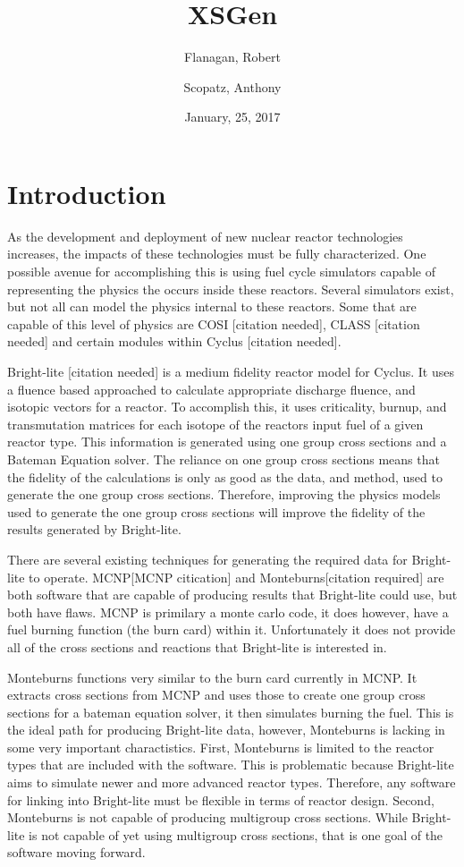 \documentclass{article}
\begin{document}
\title{XSGen}
\date{January, 25, 2017}
\author{Flanagan, Robert \and Scopatz, Anthony}
\maketitle

\section{Introduction}
As the development and deployment of new nuclear reactor technologies increases, the impacts of these technologies must be fully characterized. One possible avenue for accomplishing this is using fuel cycle simulators capable of representing the physics the occurs inside these reactors. Several simulators exist, but not all can model the physics internal to these reactors. Some that are capable of this level of physics are COSI [citation needed], CLASS [citation needed] and certain modules within Cyclus [citation needed]. 

Bright-lite [citation needed] is a medium fidelity reactor model for Cyclus. It uses a fluence based approached to calculate appropriate discharge fluence, and isotopic vectors for a reactor. To accomplish this, it uses criticality, burnup, and transmutation matrices for each isotope of the reactors input fuel of a given reactor type. This information is generated using one group cross sections and a Bateman Equation solver. The reliance on one group cross sections means that the fidelity of the calculations is only as good as the data, and method, used to generate the one group cross sections. Therefore, improving the physics models used to generate the one group cross sections will improve the fidelity of the results generated by Bright-lite. 

There are several existing techniques for generating the required data for Bright-lite to operate. MCNP[MCNP citication] and Monteburns[citation required] are both software that are capable of producing results that Bright-lite could use, but both have flaws. MCNP is primilary a monte carlo code, it does however, have a fuel burning function (the burn card) within it. Unfortunately it does not provide all of the cross sections and reactions that Bright-lite is interested in. 

Monteburns functions very similar to the burn card currently in MCNP. It extracts cross sections from MCNP and uses those to create one group cross sections for a bateman equation solver, it then simulates burning the fuel. This is the ideal path for producing Bright-lite data, however, Monteburns is lacking in some very important charactistics. First, Monteburns is limited to the reactor types that are included with the software. This is problematic because Bright-lite aims to simulate newer and more advanced reactor types. Therefore, any software for linking into Bright-lite must be flexible in terms of reactor design. Second, Monteburns is not capable of producing multigroup cross sections. While Bright-lite is not capable of yet using multigroup cross sections, that is one goal of the software moving forward.   
\end{document}
